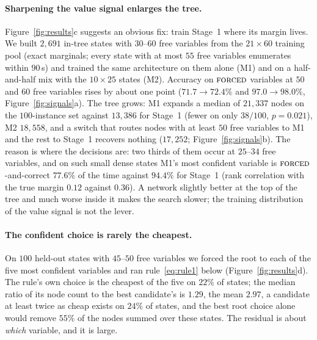 \documentclass[final,5p,times,twocolumn,authoryear]{elsarticle}
\newcommand{\FORCED}{\textsc{forced}}
\begin{document}
\paragraph{Sharpening the value signal enlarges the tree.} Figure~\ref{fig:results}c suggests an obvious fix: train Stage~1 where its margin lives. We built $2{,}691$ in-tree states with $30$--$60$ free variables from the $21\times60$ training pool (exact marginals; every state with at most $55$ free variables enumerates within $90$\,s) and trained the same architecture on them alone (M1) and on a half-and-half mix with the $10\times25$ states (M2). Accuracy on $\FORCED$ variables at $50$ and $60$ free variables rises by about one point ($71.7\to72.4\%$ and $97.0\to98.0\%$, Figure~\ref{fig:signals}a). The tree grows: M1 expands a median of $21{,}337$ nodes on the $100$-instance set against $13{,}386$ for Stage~1 (fewer on only $38/100$, $p=0.021$), M2 $18{,}558$, and a switch that routes nodes with at least $50$ free variables to M1 and the rest to Stage~1 recovers nothing ($17{,}252$; Figure~\ref{fig:signals}b). The reason is where the decisions are: two thirds of them occur at $25$--$34$ free variables, and on such small dense states M1's most confident variable is $\FORCED$-and-correct $77.6\%$ of the time against $94.4\%$ for Stage~1 (rank correlation with the true margin $0.12$ against $0.36$). A network slightly better at the top of the tree and much worse inside it makes the search slower; the training distribution of the value signal is not the lever.

\paragraph{The confident choice is rarely the cheapest.} On $100$ held-out states with $45$--$50$ free variables we forced the root to each of the five most confident variables and ran rule~\eqref{eq:rule1} below (Figure~\ref{fig:results}d). The rule's own choice is the cheapest of the five on $22\%$ of states; the median ratio of its node count to the best candidate's is $1.29$, the mean $2.97$, a candidate at least twice as cheap exists on $24\%$ of states, and the best root choice alone would remove $55\%$ of the nodes summed over these states. The residual is about \emph{which} variable, and it is large.
\end{document}
